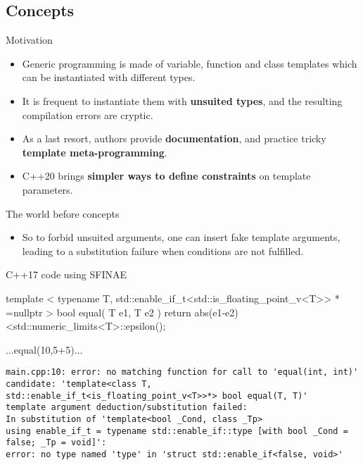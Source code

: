 \subsection[concepts]{Concepts}

\begin{frame}[fragile]
  \begin{block}{Motivation}
    \begin{itemize}
    \item Generic programming is made of variable, function and class templates which can be instantiated with different types.
    \item It is frequent to instantiate them with \textbf{unsuited types}, and the resulting compilation errors are cryptic.
    \item As a last resort, authors provide \textbf{documentation}, and practice tricky \textbf{template meta-programming}.
    \item C++20 brings \textbf{simpler ways to define constraints} on template parameters.
    \end{itemize}
  \end{block}
\end{frame}

\begin{frame}[fragile]
  \begin{block}{The world before concepts}
    \begin{itemize}
    \item So to forbid unsuited arguments, one can insert fake template arguments,
    leading to a substitution failure when conditions are not fulfilled.
    \end{itemize}
  \end{block}
  \begin{exampleblock}{C++17 code using SFINAE}
    \scriptsize
    \begin{cppcode*}{}
    template
    < typename T, std::enable_if_t<std::is_floating_point_v<T>> * =nullptr >
    bool equal( T e1, T e2 )
    { return abs(e1-e2)<std::numeric_limits<T>::epsilon(); }

    ...equal(10,5+5)...
    \end{cppcode*}
    \tiny
    \begin{verbatim}
main.cpp:10: error: no matching function for call to 'equal(int, int)'
candidate: 'template<class T, std::enable_if_t<is_floating_point_v<T>>*> bool equal(T, T)'
template argument deduction/substitution failed:
In substitution of 'template<bool _Cond, class _Tp>
using enable_if_t = typename std::enable_if::type [with bool _Cond = false; _Tp = void]':
error: no type named 'type' in 'struct std::enable_if<false, void>'
    \end{verbatim}
  \end{exampleblock}
\end{frame}

